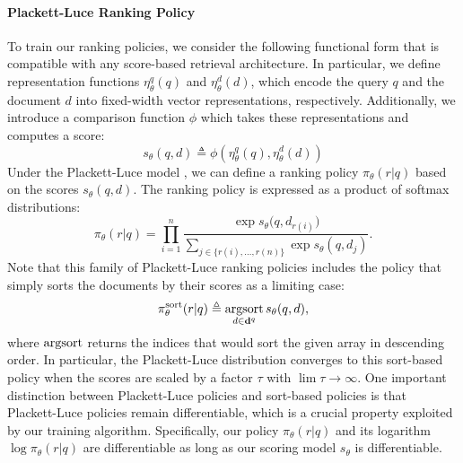 \documentclass{article}
\begin{document}
\paragraph{Plackett-Luce Ranking Policy} 
To train our ranking policies, we consider the following functional form that is compatible with any score-based retrieval architecture. In particular, we define representation functions $\eta^q_\theta(q)$ and $\eta^d_\theta(d)$, which encode the query $q$ and the document $d$ into fixed-width vector representations, respectively. Additionally, we introduce a comparison function $\phi$ which takes these representations and computes a score:
\begin{equation*}
    s_\theta(q,d) \triangleq \phi(\eta^q_\theta(q), \eta^d_\theta(d))
\end{equation*} 
Under the Plackett-Luce model \citep{plackett1975analysis, luce1959individual}, we can define a ranking policy $\pi_\theta(r|q)$ based on the scores $s_\theta(q, d)$. The ranking policy is expressed as a product of softmax distributions:
\begin{equation}
    \pi_\theta(r|q) = \prod\limits_{i=1}^{n} \frac{\exp{s_\theta(q, d_{r(i)}})}{\sum_{j \in \{r(i),\ldots,r(n)\}} \exp{s_\theta(q, d_j)}}.
    \label{eq:plackett}
\end{equation}
Note that this family of Plackett-Luce ranking policies includes the policy that simply sorts the documents by their scores as a limiting case:
\begin{equation}
    \pi^{\text{sort}}_\theta(r|q) \triangleq \operatorname*{argsort}_{d \in \mathbf{d}^{q}} s_\theta(q,d),
    \label{eq:plackett_sort}
\end{equation}
where $\operatorname*{argsort}$ returns the indices that would sort the given array in descending order. 
In particular, the Plackett-Luce distribution converges to this sort-based policy when the scores are scaled by a factor $\tau$ with $\lim \tau \rightarrow \infty$.
One important distinction between Plackett-Luce policies and sort-based policies is that Plackett-Luce policies remain differentiable, which is a crucial property exploited by our training algorithm. Specifically, our policy $\pi_\theta(r|q)$ and its logarithm $\log\pi_\theta(r|q)$ are differentiable as long as our scoring model $s_\theta$ is differentiable.
\end{document}
